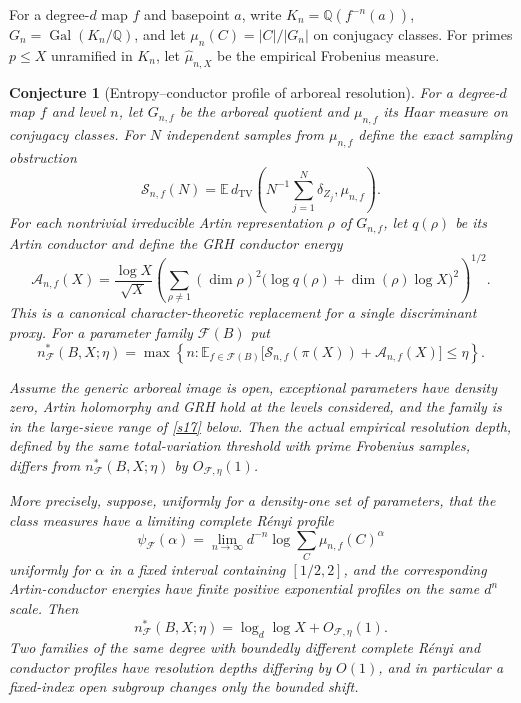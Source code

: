 \documentclass[11pt]{article}
\newtheorem{conjecture}{Conjecture}
\theoremstyle{definition}
\newcommand{\Gal}{\operatorname{Gal}}
\newcommand{\E}{\mathbb E}
\newcommand{\Q}{\mathbb Q}
\providecommand{\Q}{\mathbb Q}
\providecommand{\E}{\mathbb E}
\begin{document}
For a degree-$d$ map $f$ and basepoint $a$, write
$K_n=\Q(f^{-n}(a))$, $G_n=\Gal(K_n/\Q)$, and let
$\mu_n(C)=|C|/|G_n|$ on conjugacy classes.  For primes $p\le X$ unramified in $K_n$,
let $\widehat\mu_{n,X}$ be the empirical Frobenius measure.

\begin{conjecture}[Entropy--conductor profile of arboreal resolution]\label{s16}
For a degree-$d$ map $f$ and level $n$, let $G_{n,f}$ be the arboreal quotient and
$\mu_{n,f}$ its Haar measure on conjugacy classes.  For $N$ independent samples from
$\mu_{n,f}$ define the exact sampling obstruction
\[
 \mathcal S_{n,f}(N)=
 \E\,d_{\mathrm{TV}}\!\left(N^{-1}\sum_{j=1}^N\delta_{Z_j},\mu_{n,f}\right).
\]
For each nontrivial irreducible Artin representation $\rho$ of $G_{n,f}$, let
$q(\rho)$ be its Artin conductor and define the GRH conductor energy
\[
 \mathcal A_{n,f}(X)=
 \frac{\log X}{\sqrt X}
 \left(\sum_{\rho\ne1}(\dim\rho)^2
  \bigl(\log q(\rho)+\dim(\rho)\log X\bigr)^2\right)^{1/2}.
\]
This is a canonical character-theoretic replacement for a single discriminant proxy.
For a parameter family $\mathcal F(B)$ put
\[
 n^*_{\mathcal F}(B,X;\eta)=
 \max\left\{n:\E_{f\in\mathcal F(B)}
   \bigl[\mathcal S_{n,f}(\pi(X))+\mathcal A_{n,f}(X)\bigr]\le\eta\right\}.
\]

Assume the generic arboreal image is open, exceptional parameters have density zero,
Artin holomorphy and GRH hold at the levels considered, and the family is in the large-sieve range of \cref{s17} below.  Then the actual empirical resolution depth, defined by
the same total-variation threshold with prime Frobenius samples, differs from
$n^*_{\mathcal F}(B,X;\eta)$ by $O_{\mathcal F,\eta}(1)$.

More precisely, suppose, uniformly for a density-one set of parameters, that the class
measures have a limiting complete R\'enyi profile
\[
 \psi_{\mathcal F}(\alpha)=
 \lim_{n\to\infty}d^{-n}\log\sum_C\mu_{n,f}(C)^\alpha
\]
uniformly for $\alpha$ in a fixed interval containing $[1/2,2]$, and the corresponding
Artin-conductor energies have finite positive exponential profiles on the same
$d^n$ scale.  Then
\[
 n^*_{\mathcal F}(B,X;\eta)=\log_d\log X+O_{\mathcal F,\eta}(1).
\]
Two families of the same degree with boundedly different complete R\'enyi and conductor
profiles have resolution depths differing by $O(1)$, and in particular a fixed-index open
subgroup changes only the bounded shift.
\end{conjecture}
\end{document}
